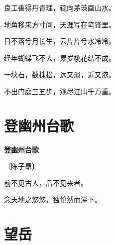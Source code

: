 \documentclass[12pt,UTF-8,openany,fontset=none]{ctexbook}
\begin{document}
\begin{center}
    \begin{Large}

        良工善得丹青理，辄向茅茨画山水。

        地角移来方寸间，天涯写在笔锋里。

        日不落兮月长生，云片片兮水冷冷。

        经年蝴蝶飞不去，累岁桃花结不成。

        一块石，数株松，远又淡，近又浓。

        不出门庭三五步，观尽江山千万重。

    \end{Large}

\end{center}

\vspace{8pt}
\clearpage

\section{登幽州台歌}


\begin{center}
    {\bfseries 登幽州台歌}

    \vspace{18pt}

    \begin{large}\xuwen
        〔陈子昂〕
    \end{large}

\end{center}

    \vspace{18pt}  %

\begin{center}
    \begin{Large}

        前不见古人，后不见来者。

        念天地之悠悠，独怆然而涕下。

    \end{Large}

\end{center}

\vspace{8pt}
\clearpage

\section{望岳}
\end{document}
